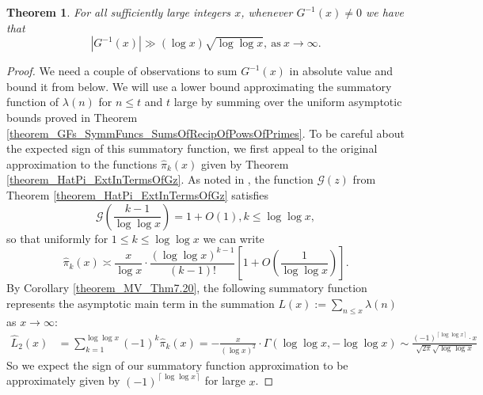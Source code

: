 \documentclass[11pt,reqno,a4letter]{article}
\numberwithin{figure}{section}
\numberwithin{table}{section}
\newcommand{\ceiling}[1]{\left\lceil #1 \right\rceil}
\theoremstyle{plain}
\newtheorem{theorem}{Theorem}
\numberwithin{theorem}{section}
\theoremstyle{definition}
\begin{document}
\begin{theorem} 
\label{theorem_GInvxLowerBoundByGEInvx_v1} 
For all sufficiently large integers $x$, whenever $G^{-1}(x) \neq 0$ we have that 
\[
|G^{-1}(x)| \gg (\log x) \sqrt{\log\log x}, \mathrm{\ as\ } x \rightarrow \infty. 
\]
\end{theorem} 
\begin{proof} 
We need a couple of observations to sum $G^{-1}(x)$ in absolute value and bound it from below. 
We will use a lower bound approximating the summatory function of $\lambda(n)$ for $n \leq t$ and 
$t$ large by summing over the uniform asymptotic bounds proved in 
Theorem \ref{theorem_GFs_SymmFuncs_SumsOfRecipOfPowsOfPrimes}. 
To be careful about the expected sign of this summatory function, 
we first appeal to the original approximation to the functions $\widehat{\pi}_k(x)$ 
given by Theorem \ref{theorem_HatPi_ExtInTermsOfGz}. 
As noted in \cite[\S 7.4]{MV}, the function $\mathcal{G}(z)$ from 
Theorem \ref{theorem_HatPi_ExtInTermsOfGz} satisfies 
\[
\mathcal{G}\left(\frac{k-1}{\log\log x}\right) = 1 + O(1), k \leq \log\log x, 
\]
so that uniformly for $1 \leq k \leq \log\log x$ we can write 
\[
\widehat{\pi}_k(x) \asymp \frac{x}{\log x} \cdot \frac{(\log\log x)^{k-1}}{(k-1)!} \left[ 
     1 + O\left(\frac{1}{\log\log x}\right)\right]. 
\]
By Corollary \ref{theorem_MV_Thm7.20}, the 
following summatory function represents the asymptotic main term 
in the summation $L(x) := \sum_{n \leq x} \lambda(n)$ as $x \rightarrow \infty$: 
\begin{align*} 
\widehat{L}_2(x) & = \sum_{k=1}^{\log\log x} (-1)^{k} \widehat{\pi}_k(x) 
     = - \frac{x}{(\log x)^2} \cdot \Gamma(\log\log x, -\log\log x) 
     \sim \frac{(-1)^{\ceiling{\log\log x}} \cdot x}{\sqrt{2\pi} \sqrt{\log\log x}}
\end{align*} 
So we expect the sign of our summatory function approximation to be approximately 
given by $(-1)^{\ceiling{\log\log x}}$ for large $x$. 


\end{proof}
\end{document}
